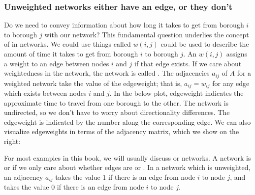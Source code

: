 \documentclass[letterpaper,10pt,english]{jupyterBook}
\begin{document}
\subsubsection{Unweighted networks either have an edge, or they don’t}
\label{\detokenize{representations/ch4/properties-of-networks:unweighted-networks-either-have-an-edge-or-they-don-t}}
\sphinxAtStartPar
Do we need to convey information about how long it takes to get from borough \(i\) to borough \(j\) with our network? This fundamental question underlies the concept of  in networks. We could use things called  \(w(i, j)\) could be used to describe the amount of time it takes to get from borough \(i\) to borough \(j\). An  \(w(i,j)\) assigns a weight to an edge between nodes \(i\) and \(j\) if that edge exists. If we care about weightedness in the network, the network is called . The adjacencies \(a_{ij}\) of \(A\) for a weighted network take the value of the edge\sphinxhyphen{}weight; that is, \(a_{ij} = w_{ij}\) for any edge which exists between nodes \(i\) and \(j\). In the below plot, edge\sphinxhyphen{}weight indicates the approximate time to travel from one borough to the other. The network is undirected, so we don’t have to worry about directionality differences. The edge\sphinxhyphen{}weight is indicated by the number along the corresponding edge. We can also visualize edge\sphinxhyphen{}weights in terms of the adjacency matrix, which we show on the right:

\noindent{}

\sphinxAtStartPar
For most examples in this book, we will usually discuss  or  networks. A network is  or  if we only care about whether edges are  or . In a network which is unweighted, an adjacency \(a_{ij}\) takes the value \(1\) if there is an edge from node \(i\) to node \(j\), and takes the value \(0\) if there is  an edge from node \(i\) to node \(j\).
\end{document}
